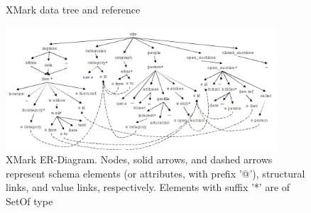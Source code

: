 \begin{figure}[H]
	\centering
	\centering
	\caption{XMark data tree and reference~\citep{xmark/original}}
	\label{fig:xmark-tree-reference}
\end{figure}
\begin{figure}[H]
	\centering
	\includegraphics[width=0.90\textwidth]{img/xmark-schema-4}
	\caption{XMark ER-Diagram. Nodes, solid arrows, and dashed arrows represent schema elements (or attributes, with prefix '@'), structural links, and value links, respectively. Elements with suffix '*' are of SetOf type\citep{xmark/schema-sumerize}}
	\label{fig:xmark-schema}
\end{figure}


